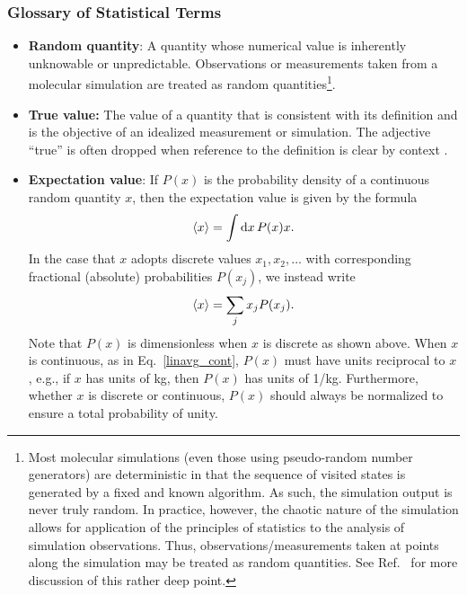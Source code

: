 \subsubsection{Glossary of Statistical Terms}
\begin{itemize}

\item {\bf Random quantity}: A quantity whose numerical value is inherently unknowable or unpredictable.
  Observations or measurements taken from a molecular simulation are treated as random quantities\footnote{Most molecular simulations (even those using pseudo-random number generators) are deterministic in that the sequence of visited states is generated by a fixed and known algorithm.  As such, the simulation output is never truly random.
In practice, however, the chaotic nature of the simulation allows for application of the principles of statistics to the analysis of simulation observations.
Thus, observations/measurements taken at points along the simulation may be treated as random quantities.
See Ref.~\cite{Leimkuhler} for more discussion of this rather deep point.}.

\item {\bf True value:}  The value of a quantity that is consistent with its definition and is the objective of an idealized measurement or simulation. The adjective ``true'' is often dropped when reference to the definition is clear by context \citep{JCGM:GUM2008,JCGM:VIM2012}.
  \label{def:true_value}

\item {\bf Expectation value}:  If $P(x)$ is the probability density of a continuous random quantity $x$, then the expectation value is given by the formula
\begin{align}
  \langle x \rangle = \int {\rm d}x\, P(x) x.
  \label{linavg_cont}
\end{align}
In the case that $x$ adopts discrete values $x_1,x_2,...$ with corresponding fractional (absolute) probabilities $P(x_j)$, we instead write
\begin{align}
  \langle x \rangle = \sum_j x_j P(x_j).
  \label{linavg}
\end{align}
Note that $P(x)$ is dimensionless when $x$ is discrete as shown above.
When $x$ is continuous, as in Eq.~\ref{linavg_cont}, $P(x)$ must have units reciprocal to $x$, e.g., if $x$ has units of kg, then $P(x)$ has units of 1/kg. 
Furthermore, whether $x$ is discrete or continuous, $P(x)$ should always be normalized to ensure a total probability of unity.


\end{itemize}
